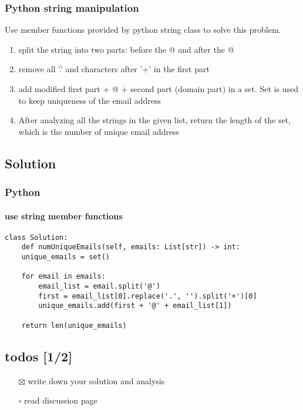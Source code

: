 \documentclass[11pt]{article}
\begin{document}
\subsubsection{Python string manipulation}
\label{sec:org19da865}
Use member functions provided by python string class to solve this problem.
\begin{enumerate}
\item split the string into two parts: before the @ and after the @
\item remove all '.'  and characters after '+' in the first part
\item add modified first part + @ + second part (domain part) in a set. Set is used to keep uniqueness of the email address
\item After analyzing all the strings in the given list, return the length of the set, which is the number of unique email address
\end{enumerate}
\subsection{Solution}
\label{sec:org5b2e926}
\subsubsection{Python}
\label{sec:orgb153cdc}
\paragraph{use string member functions}
\label{sec:orga906f2f}
\begin{verbatim}
class Solution:
    def numUniqueEmails(self, emails: List[str]) -> int:
	unique_emails = set()

	for email in emails:
	    email_list = email.split('@')
	    first = email_list[0].replace('.', '').split('+')[0]
	    unique_emails.add(first + '@' + email_list[1])

	return len(unique_emails)
\end{verbatim}
\subsection{todos [1/2]}
\label{sec:orge471ec3}
\begin{itemize}
\item[{$\boxtimes$}] write down your solution and analysis
\item[{$\square$}] read discussion page
\end{itemize}
\end{document}
